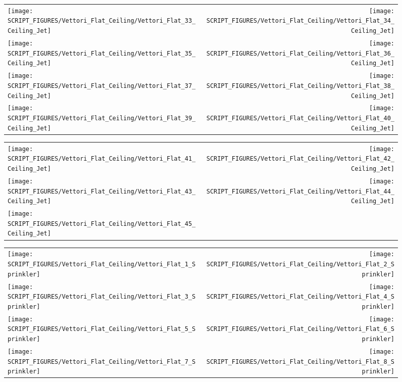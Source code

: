 \begin{figure}[p]
\begin{tabular*}{\textwidth}{l@{\extracolsep{\fill}}r}
\texttt{[image: SCRIPT\_FIGURES/Vettori\_Flat\_Ceiling/Vettori\_Flat\_33\_Ceiling\_Jet]} &
\texttt{[image: SCRIPT\_FIGURES/Vettori\_Flat\_Ceiling/Vettori\_Flat\_34\_Ceiling\_Jet]} \\
\texttt{[image: SCRIPT\_FIGURES/Vettori\_Flat\_Ceiling/Vettori\_Flat\_35\_Ceiling\_Jet]} &
\texttt{[image: SCRIPT\_FIGURES/Vettori\_Flat\_Ceiling/Vettori\_Flat\_36\_Ceiling\_Jet]} \\
\texttt{[image: SCRIPT\_FIGURES/Vettori\_Flat\_Ceiling/Vettori\_Flat\_37\_Ceiling\_Jet]} &
\texttt{[image: SCRIPT\_FIGURES/Vettori\_Flat\_Ceiling/Vettori\_Flat\_38\_Ceiling\_Jet]} \\
\texttt{[image: SCRIPT\_FIGURES/Vettori\_Flat\_Ceiling/Vettori\_Flat\_39\_Ceiling\_Jet]} &
\texttt{[image: SCRIPT\_FIGURES/Vettori\_Flat\_Ceiling/Vettori\_Flat\_40\_Ceiling\_Jet]}
\end{tabular*}
\end{figure}

\begin{figure}[p]
\begin{tabular*}{\textwidth}{l@{\extracolsep{\fill}}r}
\texttt{[image: SCRIPT\_FIGURES/Vettori\_Flat\_Ceiling/Vettori\_Flat\_41\_Ceiling\_Jet]} &
\texttt{[image: SCRIPT\_FIGURES/Vettori\_Flat\_Ceiling/Vettori\_Flat\_42\_Ceiling\_Jet]} \\
\texttt{[image: SCRIPT\_FIGURES/Vettori\_Flat\_Ceiling/Vettori\_Flat\_43\_Ceiling\_Jet]} &
\texttt{[image: SCRIPT\_FIGURES/Vettori\_Flat\_Ceiling/Vettori\_Flat\_44\_Ceiling\_Jet]} \\
\texttt{[image: SCRIPT\_FIGURES/Vettori\_Flat\_Ceiling/Vettori\_Flat\_45\_Ceiling\_Jet]}
\end{tabular*}
\end{figure}

\begin{figure}[p]
\begin{tabular*}{\textwidth}{l@{\extracolsep{\fill}}r}
\texttt{[image: SCRIPT\_FIGURES/Vettori\_Flat\_Ceiling/Vettori\_Flat\_1\_Sprinkler]} &
\texttt{[image: SCRIPT\_FIGURES/Vettori\_Flat\_Ceiling/Vettori\_Flat\_2\_Sprinkler]} \\
\texttt{[image: SCRIPT\_FIGURES/Vettori\_Flat\_Ceiling/Vettori\_Flat\_3\_Sprinkler]} &
\texttt{[image: SCRIPT\_FIGURES/Vettori\_Flat\_Ceiling/Vettori\_Flat\_4\_Sprinkler]} \\
\texttt{[image: SCRIPT\_FIGURES/Vettori\_Flat\_Ceiling/Vettori\_Flat\_5\_Sprinkler]} &
\texttt{[image: SCRIPT\_FIGURES/Vettori\_Flat\_Ceiling/Vettori\_Flat\_6\_Sprinkler]} \\
\texttt{[image: SCRIPT\_FIGURES/Vettori\_Flat\_Ceiling/Vettori\_Flat\_7\_Sprinkler]} &
\texttt{[image: SCRIPT\_FIGURES/Vettori\_Flat\_Ceiling/Vettori\_Flat\_8\_Sprinkler]}
\end{tabular*}
\end{figure}

